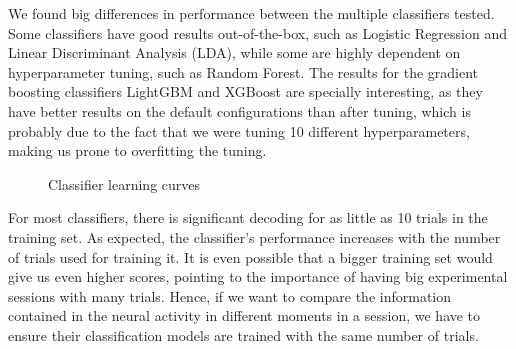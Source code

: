     We found big differences in performance between the multiple classifiers tested. Some classifiers have good results out-of-the-box, such as Logistic Regression and Linear Discriminant Analysis (LDA), while some are highly dependent on hyperparameter tuning, such as Random Forest. The results for the gradient boosting classifiers LightGBM and XGBoost are specially interesting, as they have better results on the default configurations than after tuning, which is probably due to the fact that we were tuning 10 different hyperparameters, making us prone to overfitting the tuning.
    
    \begin{figure}
        \centering
        \caption{Classifier learning curves}
        \label{fig:clf_curves}
    \end{figure}
    For most classifiers, there is significant decoding for as little as 10 trials in the training set. As expected, the classifier's performance increases with the number of trials used for training it. It is even possible that a bigger training set would give us even higher scores, pointing to the importance of having big experimental sessions with many trials. Hence, if we want to compare the information contained in the neural activity in different moments in a session, we have to ensure their classification models are trained with the same number of trials.
